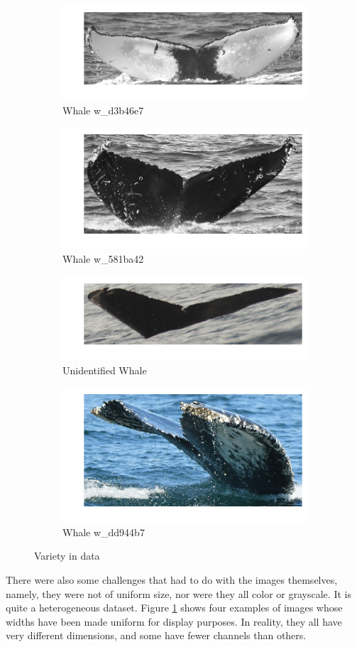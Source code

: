 \begin{figure}[h!]
	\begin{subfigure}{.5\textwidth}
		\includegraphics[width=.7\textwidth]{images/w_d3b46e7.png}
		\caption{Whale w\_d3b46e7}
	\end{subfigure}
	\begin{subfigure}{.5\textwidth}
		\includegraphics[width=.7\textwidth]{images/w_581ba42.png}
		\caption{Whale w\_581ba42}
	\end{subfigure}
	\begin{subfigure}{.5\textwidth}
		\includegraphics[width=.7\textwidth]{images/new_whale.png}
		\caption{Unidentified Whale}
	\end{subfigure}
	\begin{subfigure}{.5\textwidth}
		\includegraphics[width=.7\textwidth]{images/w_dd944b7.png}
		\caption{Whale w\_dd944b7}
	\end{subfigure}
	\caption{\label{fig:whale}Variety in data}
\end{figure}

There were also some challenges that had to do with the images themselves, namely, they were not of uniform size, nor were they all color or grayscale. It is quite a heterogeneous dataset. Figure \ref{fig:whale} shows four examples of images whose widths have been made uniform for display purposes. In reality, they all have very different dimensions, and some have fewer channels than others.\\
